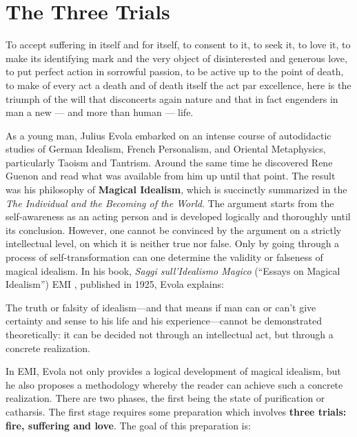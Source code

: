 \section{The Three Trials}

\begin{quotex}
To accept suffering in itself and for itself, to consent to it, to seek it, to love it, to make its identifying mark and the very object of disinterested and generous love, to put perfect action in sorrowful passion, to be active up to the point of death, to make of every act a death and of death itself the act par excellence, here is the triumph of the will that disconcerts again nature and that in fact engenders in man a new --- and more than human --- life.
\end{quotex}


As a young man, Julius Evola embarked on an intense course of autodidactic studies of German Idealism, French Personalism, and Oriental Metaphysics, particularly Taoism and Tantrism. Around the same time he discovered Rene Guenon and read what was available from him up until that point. The result was his philosophy of \textbf{Magical Idealism}, which is succinctly summarized in the \emph{The Individual and the Becoming of the World}. The argument starts from the self-awareness as an acting person and is developed logically and thoroughly until its conclusion. However, one cannot be convinced by the argument on a strictly intellectual level, on which it is neither true nor false. Only by going through a process of self-transformation can one determine the validity or falseness of magical idealism. In his book, \emph{Saggi sull'Idealismo Magico} (``Essays on Magical Idealism'') EMI , published in 1925, Evola explains:

\begin{quotex}
The truth or falsity of idealism---and that means if man can or can't give certainty and sense to his life and his experience---cannot be demonstrated theoretically: it can be decided not through an intellectual act, but through a concrete realization.
\end{quotex}


In EMI, Evola not only provides a logical development of magical idealism, but he also proposes a methodology whereby the reader can achieve such a concrete realization. There are two phases, the first being the state of purification or catharsis. The first stage requires some preparation which involves \textbf{three trials: fire, suffering and love}. The goal of this preparation is:

